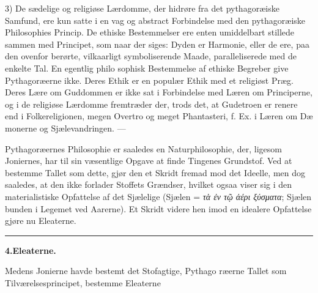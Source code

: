 \documentclass[12pt,a4paper]{book}
\newcommand{\divrule}{\begin{center}\rule{2cm}{0.4pt}\end{center}}
\newcommand{\gk}[1]{\textit{#1}}
\begin{document}
3) De sædelige og religiøse Lærdomme, der hidrøre fra det
pythagoræiske Samfund, ere kun satte i en vag og abstract
Forbindelse med den pythagoræiske Philosophies Princip. De
ethiske Bestemmelser ere enten umiddelbart stillede sammen
med Principet, som naar der siges: Dyden er Harmonie, eller
de ere, paa den ovenfor berørte, vilkaarligt symboliserende
Maade, paralleliserede med de enkelte Tal. En egentlig philo\-%
sophisk Bestemmelse af ethiske Begreber give Pythagoræerne
ikke. Deres Ethik er en populær Ethik med et religiøst Præg.
Deres Lære om Guddommen er ikke sat i Forbindelse med
Læren om Principerne, og i de religiøse Lærdomme fremtræder
der, trods det, at Gudetroen er renere end i Folkereligionen,
megen Overtro og meget Phantasteri, f. Ex. i Læren om Dæ\-%
monerne og Sjælevandringen. ---

Pythagoræernes Philosophie er saaledes en Naturphilosophie,
der, ligesom Joniernes, har til sin væsentlige Opgave at finde
Tingenes Grundstof. Ved at bestemme Tallet som dette, gjør
den et Skridt fremad mod det Ideelle, men dog saaledes, at
den ikke forlader Stoffets Grændser, hvilket ogsaa viser sig i
den materialistiske Opfattelse af det Sjælelige (Sjælen = \gk{τὰ ἐν
τῷ ἀέρι ξύσματα}; Sjælen bunden i Legemet ved Aarerne).
Et Skridt videre hen imod en idealere Opfattelse gjøre nu
Eleaterne.
\divrule
\begin{center}
\textbf{4.\enspace Eleaterne.}
\end{center}
Medens Jonierne havde bestemt det Stofagtige, Pythago\-%
ræerne Tallet som Tilværelsesprincipet, bestemme Eleaterne
\end{document}
